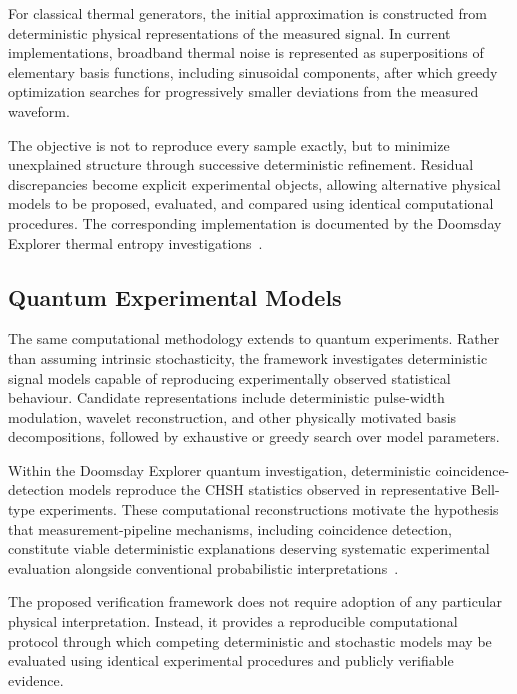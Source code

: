 \documentclass[11pt]{article}
\begin{document}
For classical thermal generators,
the initial approximation is constructed from deterministic physical
representations of the measured signal.
In current implementations,
broadband thermal noise is represented as superpositions of elementary
basis functions,
including sinusoidal components,
after which greedy optimization searches for progressively smaller
deviations from the measured waveform.

The objective is not to reproduce every sample exactly,
but to minimize unexplained structure through successive deterministic
refinement.
Residual discrepancies become explicit experimental objects,
allowing alternative physical models to be proposed,
evaluated,
and compared using identical computational procedures.
The corresponding implementation is documented by the Doomsday Explorer
thermal entropy investigations~\cite{doomsdayThermal2026}.


\subsection{Quantum Experimental Models}

The same computational methodology extends to quantum experiments.
Rather than assuming intrinsic stochasticity,
the framework investigates deterministic signal models capable of
reproducing experimentally observed statistical behaviour.
Candidate representations include deterministic pulse-width modulation,
wavelet reconstruction,
and other physically motivated basis decompositions,
followed by exhaustive or greedy search over model parameters.

Within the Doomsday Explorer quantum investigation,
deterministic coincidence-detection models reproduce the CHSH statistics
observed in representative Bell-type experiments.
These computational reconstructions motivate the hypothesis that
measurement-pipeline mechanisms,
including coincidence detection,
constitute viable deterministic explanations deserving systematic
experimental evaluation alongside conventional probabilistic
interpretations~\cite{doomsdayQuantum2026,doomsdayBell2026}.

The proposed verification framework does not require adoption of any
particular physical interpretation.
Instead,
it provides a reproducible computational protocol through which
competing deterministic and stochastic models may be evaluated using
identical experimental procedures and publicly verifiable evidence.
\end{document}
